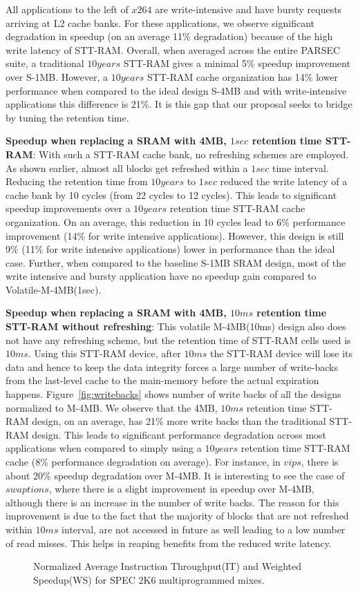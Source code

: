 All applications to the left of $x264$ are write-intensive and have bursty requests arriving at L2 cache banks. For these applications, we observe significant degradation in speedup (on an average 11\% degradation) because of the high write latency of STT-RAM.
Overall, when averaged across the entire PARSEC suite, a traditional $10years$ STT-RAM gives a minimal 5\% speedup improvement over S-1MB. However, a $10years$ STT-RAM cache organization has 14\% lower performance when compared to the ideal design S-4MB and with write-intensive applications this difference is 21\%. It is this gap that our proposal seeks to bridge by tuning the retention time.

{\bf Speedup when replacing a SRAM with 4MB, $1sec$ retention time STT-RAM}: With such a STT-RAM cache bank, no refreshing schemes are employed. As shown earlier, almost all blocks get refreshed within a $1sec$ time interval. Reducing the retention time from $10years$ to $1sec$ reduced the write latency of a cache bank by 10 cycles (from 22 cycles to 12 cycles). This leads to significant speedup improvements over a $10years$ retention time STT-RAM cache organization. On an average, this reduction in 10 cycles lead to 6\% performance improvement (14\% for write intensive applications). However, this design is still 9\% (11\% for write intensive applications) lower in performance than the ideal case.
Further, when compared to the baseline S-1MB SRAM design, most of the write intensive and bursty application have no speedup gain compared to
Volatile-M-4MB(1sec).

{\bf Speedup when replacing a SRAM with 4MB, $10ms$ retention time STT-RAM without refreshing}: This volatile M-4MB(10ms) design also does not have any refreshing scheme, but the retention time of STT-RAM cells used is $10ms$. Using this STT-RAM device, after $10ms$ the STT-RAM device will lose its data and hence to keep the data integrity forces a large number of write-backs from the last-level cache to the main-memory before the actual expiration happens. Figure~\ref{fig:writebacks} shows number of write backs of all the designs normalized to M-4MB. We observe that the 4MB, $10ms$ retention time STT-RAM design, on an average, has 21\% more write backs than the traditional STT-RAM design.
This leads to significant performance degradation across most applications when compared to simply using a $10years$ retention time STT-RAM cache (8\% performance degradation on average). For instance, in $vips$, there is about 20\% speedup degradation over M-4MB. It is interesting to see the case of $swaptions$, where there is a slight improvement in speedup over M-4MB, although there is an increase in the number of write backs. The reason for this improvement is due to the fact that the majority of blocks that are not refreshed within $10ms$ interval, are not accessed in future as well leading to a low number of read misses. This helps in reaping benefits from the reduced write latency.
\begin{figure*} [t]
\centering
 \caption{\label{fig:spec-new} Normalized Average Instruction Throughput(IT) and Weighted Speedup(WS) for SPEC 2K6 multiprogrammed mixes. }
\end{figure*}


